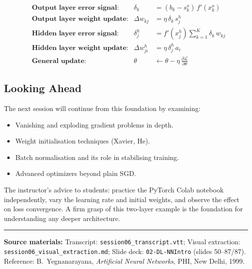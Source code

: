\documentclass[12pt,a4paper]{article}
\newcommand{\pd}[2]{\frac{\partial #1}{\partial #2}}
\newcommand{\wji}{w_{ji}^{h}}
\newcommand{\wkj}{w_{kj}}
\newcommand{\sho}{s_{j}^{h}}
\newcommand{\sko}{s_{k}^{o}}
\newcommand{\deltak}{\delta_{k}}
\newcommand{\deltajh}{\delta_{j}^{h}}
\newcommand{\xho}{x_{j}^{h}}
\newcommand{\xko}{x_{k}^{o}}
\begin{document}
\begin{keyinsight}[title=Essential Backpropagation Formulae]
\begin{align*}
  &\textbf{Output layer error signal:}
  &\deltak &= (b_k - \sko)\,f'(\xko)\\
  &\textbf{Output layer weight update:}
  &\Delta\wkj &= \eta\,\deltak\,\sho\\
  &\textbf{Hidden layer error signal:}
  &\deltajh &= f'(\xho)\sum_{k=1}^{K}\deltak\,\wkj\\
  &\textbf{Hidden layer weight update:}
  &\Delta\wji &= \eta\,\deltajh\,a_i\\
  &\textbf{General update:}
  &\theta &\leftarrow \theta - \eta\,\pd{\mathcal{L}}{\theta}
\end{align*}
\end{keyinsight}

\subsection{Looking Ahead}

The next session will continue from this foundation by examining:

\begin{itemize}[noitemsep]
  \item Vanishing and exploding gradient problems in depth.
  \item Weight initialisation techniques (Xavier, He).
  \item Batch normalisation and its role in stabilising training.
  \item Advanced optimizers beyond plain SGD.
\end{itemize}

The instructor's advice to students: practice the PyTorch Colab notebook
independently, vary the learning rate and initial weights, and observe the
effect on loss convergence.  A firm grasp of this two-layer example is the
foundation for understanding any deeper architecture.

\vspace{1cm}
\hrule
\vspace{0.4cm}
{\small
\textbf{Source materials:}
Transcript: \texttt{session06\_transcript.vtt};
Visual extraction: \texttt{session06\_visual\_extraction.md};
Slide deck: \texttt{02-DL-NNIntro} (slides 50--87/87).
Reference: B.\ Yegnanarayana, \textit{Artificial Neural Networks}, PHI,
New Delhi, 1999.
}
\end{document}
